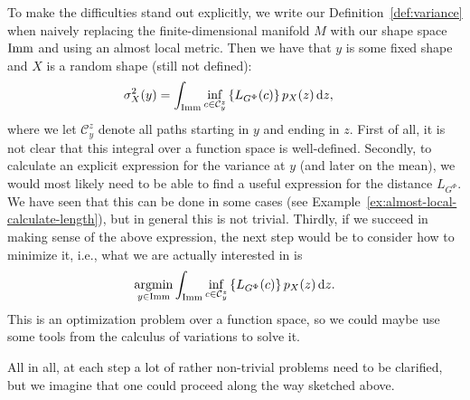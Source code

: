 To make the difficulties stand out explicitly, we write our Definition~\ref{def:variance} when naively replacing the finite-dimensional manifold $M$ with our shape space $\mathop{}\!\mathrm{Imm}$ and using an almost local metric. Then we have that $y$ is some fixed shape and $X$ is a random shape (still not defined):
\begin{align*}
  \sigma^2_X(y) &  = \int_{\mathop{}\!\mathrm{Imm}}
                  \inf_{c \in \mathcal{C}_{y}^z}
                  \left\{
                  L_{G^\Phi}(c)
                  \right\}
                  p_X(z)
                  \mathop{}\!\mathrm{d} z
  ,
\end{align*}
where we let $\mathcal{C}_y^z$ denote all paths starting in $y$ and ending in $z$.
First of all, it is not clear that this integral over a function space is well-defined.
Secondly, to calculate an explicit expression for the variance at $y$ (and later on the mean), we would most likely need to be able to find a useful expression for the distance $L_{G^{\Phi}}$. We have seen that this can be done in some cases (see Example~\ref{ex:almost-local-calculate-length}), but in general this is not trivial.
Thirdly, if we succeed in making sense of the above expression, the next step would be to consider how to minimize it, i.e., what we are actually interested in is
\begin{equation*}
  \operatorname*{argmin}_{y \in \mathop{}\!\mathrm{Imm}}
  \int_{\mathop{}\!\mathrm{Imm}}
  \inf_{c \in \mathcal{C}_{y}^z}
  \left\{
    L_{G^\Phi}(c)
  \right\}
  p_X(z)
  \mathop{}\!\mathrm{d} z.
\end{equation*}
This is an optimization problem over a function space, so we could maybe use some tools from the calculus of variations to solve it.

All in all, at each step a lot of rather non-trivial problems need to be clarified, but we imagine that one could proceed along the way sketched above.


